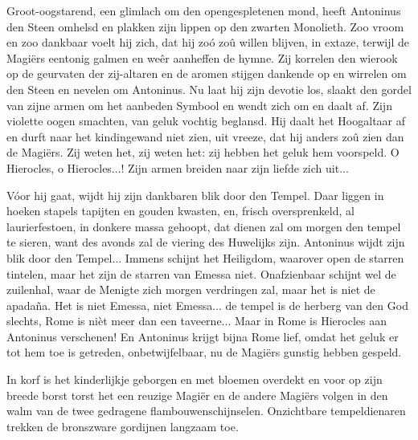 \documentclass[a4paper, 12pt, oneside, dutch]{article}
\begin{document}
Groot-oogstarend, een glimlach om den opengespletenen mond, heeft Antoninus den Steen omhelsd en plakken zijn lippen op den zwarten Monolieth. Zoo vroom en zoo dankbaar voelt hij zich, dat hij zoó zoû willen blijven, in extaze, terwijl de Magiërs eentonig galmen en weêr aanheffen de hymne. Zij korrelen den wierook op de geurvaten der zij-altaren en de aromen stijgen dankende op en wirrelen om den Steen en nevelen om Antoninus. Nu laat hij zijn devotie los, slaakt den gordel van zijne armen om het aanbeden Symbool en wendt zich om en daalt af. Zijn violette oogen smachten, van geluk vochtig beglansd. Hij daalt het Hoogaltaar af en durft naar het kindingewand niet zien, uit vreeze, dat hij anders zoû zien dan de Magiërs. Zij weten het, zij weten het: zij hebben het geluk hem voorspeld. O Hierocles, o Hierocles...! Zijn armen breiden naar zijn liefde zich uit...

Vóor hij gaat, wijdt hij zijn dankbaren blik door den Tempel. Daar liggen in hoeken stapels tapijten en gouden kwasten, en, frisch oversprenkeld, al laurierfestoen, in donkere massa gehoopt, dat dienen zal om morgen den tempel te sieren, want des avonds zal de viering des Huwelijks zijn. Antoninus wijdt zijn blik door den Tempel... Immens schijnt het Heiligdom, waarover open de starren tintelen, maar het zijn de starren van Emessa niet. Onafzienbaar schijnt wel de zuilenhal, waar de Menigte zich morgen verdringen zal, maar het is niet de apadaña. Het is niet Emessa, niet Emessa... de tempel is de herberg van den God slechts, Rome is nièt meer dan een taveerne... Maar in Rome is Hierocles aan Antoninus verschenen! En Antoninus krijgt bijna Rome lief, omdat het geluk er tot hem toe is getreden, onbetwijfelbaar, nu de Magiërs gunstig hebben gespeld.

In korf is het kinderlijkje geborgen en met bloemen overdekt en voor op zijn breede borst torst het een reuzige Magiër en de andere Magiërs volgen in den walm van de twee gedragene flambouwenschijnselen. Onzichtbare tempeldienaren trekken de bronszware gordijnen langzaam toe.

\subsection{}
\end{document}
